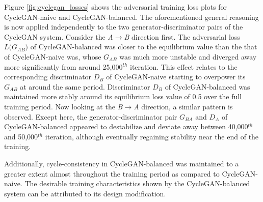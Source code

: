 Figure \ref{fig:cyclegan_losses} shows the adversarial training loss plots for CycleGAN-naive and CycleGAN-balanced. The aforementioned general reasoning is now applied independently to the two generator-discriminator pairs of the CycleGAN system. Consider the \textit{A}$\rightarrow$\textit{B} direction first. The adversarial loss $L({G_{AB})}$ of CycleGAN-balanced was closer to the equilibrium value than the that of CycleGAN-naive was, whose $G_{AB}$ was much more unstable and diverged away more significantly from around 25,000$^{th}$ iteration. This effect relates to the corresponding discriminator $D_B$ of CycleGAN-naive starting to overpower its $G_{AB}$ at around the same period. Discriminator $D_B$ of CycleGAN-balanced was maintained more stably around its equilibrium loss value of 0.5 over the full training period. Now looking at the \textit{B}$\rightarrow$\textit{A} direction, a similar pattern is observed. Except here, the generator-discriminator pair $G_{BA}$ and $D_A$ of CycleGAN-balanced appeared to destabilize and deviate away between 40,000$^{th}$ and 50,000$^{th}$ iteration, although eventually regaining stability near the end of the training. 

Additionally, cycle-consistency in CycleGAN-balanced was maintained to a greater extent almost throughout the training period as compared to CycleGAN-naive. The desirable training characteristics shown by the CycleGAN-balanced system can be attributed to its design modification.

